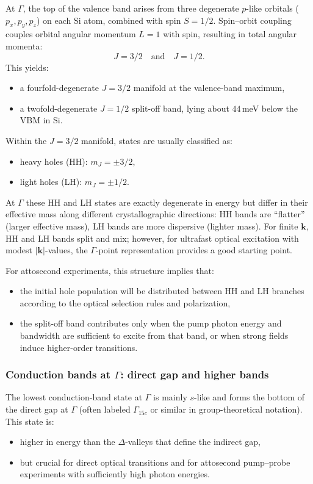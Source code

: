 At $\Gamma$, the top of the valence band arises from three degenerate $p$-like orbitals ($p_x,p_y,p_z$) on each Si atom, combined with spin $S=1/2$. 
Spin--orbit coupling couples orbital angular momentum $L=1$ with spin, resulting in total angular momenta:
\[
J = 3/2 \quad\text{and}\quad J = 1/2.
\]
This yields:
\begin{itemize}
  \item a fourfold-degenerate $J=3/2$ manifold at the valence-band maximum, 
  \item a twofold-degenerate $J=1/2$ split-off band, lying about $44$\,meV below the VBM in Si.\cite{Robertson1983}
\end{itemize}

Within the $J=3/2$ manifold, states are usually classified as:
\begin{itemize}
  \item heavy holes (HH): $m_J = \pm 3/2$,
  \item light holes (LH): $m_J = \pm 1/2$.
\end{itemize}
At $\Gamma$ these HH and LH states are exactly degenerate in energy but differ in their effective mass along different crystallographic directions: HH bands are ``flatter'' (larger effective mass), LH bands are more dispersive (lighter mass).
For finite $\mathbf k$, HH and LH bands split and mix; however, for ultrafast optical excitation with modest $|\mathbf k|$-values, the $\Gamma$-point representation provides a good starting point.

For attosecond experiments, this structure implies that:
\begin{itemize}
  \item the initial hole population will be distributed between HH and LH branches according to the optical selection rules and polarization,
  \item the split-off band contributes only when the pump photon energy and bandwidth are sufficient to excite from that band, or when strong fields induce higher-order transitions.
\end{itemize}

\subsubsection{Conduction bands at $\Gamma$: direct gap and higher bands}

The lowest conduction-band state at $\Gamma$ is mainly $s$-like and forms the bottom of the direct gap at $\Gamma$ (often labeled $\Gamma_{15c}$ or similar in group-theoretical notation).\cite{Robertson1983}
This state is:
\begin{itemize}
  \item higher in energy than the $\Delta$-valleys that define the indirect gap,
  \item but crucial for direct optical transitions and for attosecond pump--probe experiments with sufficiently high photon energies.
\end{itemize}

